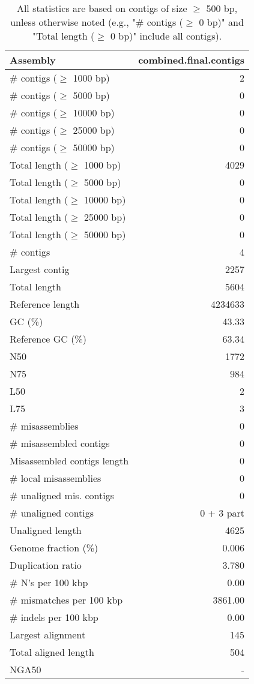 \documentclass[12pt,a4paper]{article}
\begin{document}
\begin{table}[ht]
\begin{center}
\caption{All statistics are based on contigs of size $\geq$ 500 bp, unless otherwise noted (e.g., "\# contigs ($\geq$ 0 bp)" and "Total length ($\geq$ 0 bp)" include all contigs).}
\begin{tabular}{|l*{1}{|r}|}
\hline
Assembly & combined.final.contigs \\ \hline
\# contigs ($\geq$ 1000 bp) & 2 \\ \hline
\# contigs ($\geq$ 5000 bp) & 0 \\ \hline
\# contigs ($\geq$ 10000 bp) & 0 \\ \hline
\# contigs ($\geq$ 25000 bp) & 0 \\ \hline
\# contigs ($\geq$ 50000 bp) & 0 \\ \hline
Total length ($\geq$ 1000 bp) & 4029 \\ \hline
Total length ($\geq$ 5000 bp) & 0 \\ \hline
Total length ($\geq$ 10000 bp) & 0 \\ \hline
Total length ($\geq$ 25000 bp) & 0 \\ \hline
Total length ($\geq$ 50000 bp) & 0 \\ \hline
\# contigs & 4 \\ \hline
Largest contig & 2257 \\ \hline
Total length & 5604 \\ \hline
Reference length & 4234633 \\ \hline
GC (\%) & 43.33 \\ \hline
Reference GC (\%) & 63.34 \\ \hline
N50 & 1772 \\ \hline
N75 & 984 \\ \hline
L50 & 2 \\ \hline
L75 & 3 \\ \hline
\# misassemblies & 0 \\ \hline
\# misassembled contigs & 0 \\ \hline
Misassembled contigs length & 0 \\ \hline
\# local misassemblies & 0 \\ \hline
\# unaligned mis. contigs & 0 \\ \hline
\# unaligned contigs & 0 + 3 part \\ \hline
Unaligned length & 4625 \\ \hline
Genome fraction (\%) & 0.006 \\ \hline
Duplication ratio & 3.780 \\ \hline
\# N's per 100 kbp & 0.00 \\ \hline
\# mismatches per 100 kbp & 3861.00 \\ \hline
\# indels per 100 kbp & 0.00 \\ \hline
Largest alignment & 145 \\ \hline
Total aligned length & 504 \\ \hline
NGA50 & - \\ \hline
\end{tabular}
\end{center}
\end{table}
\end{document}
